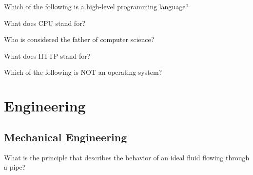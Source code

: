 \documentclass[12pt,a4paper]{book}
\begin{document}
\begin{enhancedmcq}{Which of the following is a high-level programming language?}
\end{enhancedmcq}

\begin{enhancedmcq}{What does CPU stand for?}
\end{enhancedmcq}

\begin{enhancedmcq}{Who is considered the father of computer science?}
\end{enhancedmcq}

\begin{enhancedmcq}[Networking]{What does HTTP stand for?}
\end{enhancedmcq}

\begin{enhancedmcq}{Which of the following is NOT an operating system?}
\end{enhancedmcq}

\chapter{Engineering}
\section{Mechanical Engineering}

\begin{enhancedmcq}{What is the principle that describes the behavior of an ideal fluid flowing through a pipe?}
\end{enhancedmcq}
\end{document}
